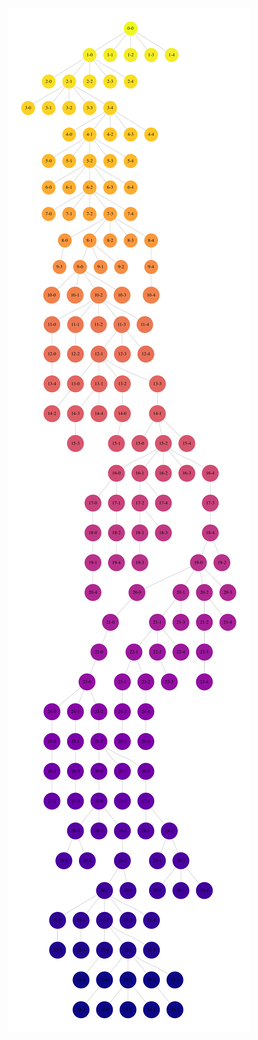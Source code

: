 \begin{figure}[t]
\centering
 \begin{minipage}{1.0\hsize}
 \centering
 \includegraphics[scale=0.03, angle=90]{Figures/tree_chi_pacs_best.pdf}

\end{minipage}
\end{figure}
